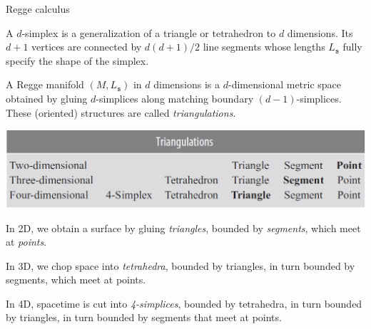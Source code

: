 \documentclass{beamer}
\newcommand\italictext[1]{\textcolor{italics}{\textit{#1}}}
\begin{document}
\begin{frame}{Regge calculus}
    \begin{list}{\maltese}{\leftmargin=1em \itemindent=0em}
        \item<1-> A $d$-simplex is a generalization of a triangle or tetrahedron to $d$ dimensions. Its $d+1$ vertices are connected by $d(d+1)/2$ line segments whose lengths $L_\mathtt{s}$ fully specify the shape of the simplex.
        \item<2-> A Regge manifold $(M,L_\mathtt{s})$ in $d$ dimensions is a $d$-dimensional metric space obtained by gluing $d$-simplices along matching boundary $(d-1)$-simplices. These (oriented) structures are called \italictext{triangulations}.\\\noindent
        \begin{minipage}{\linewidth}
            \centering
            \includegraphics[width=0.8\linewidth]{4.2}
        \end{minipage}
        \item<3-> In 2D, we obtain a surface by gluing \italictext{triangles}, bounded by \italictext{segments}, which meet at \italictext{points}.
        \item<4-> In 3D, we chop space into \italictext{tetrahedra}, bounded by triangles, in turn bounded by segments, which meet at points.
        \item<5-> In 4D, spacetime is cut into \italictext{4-simplices}, bounded by tetrahedra, in turn bounded by triangles, in turn bounded by segments that meet at points.
    \end{list}
\end{frame}
\end{document}
